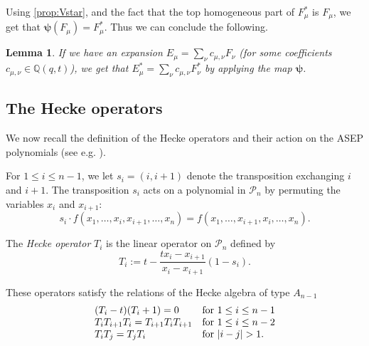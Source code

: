 \documentclass[12pt]{amsart}
\newtheorem{lem}[thm]{Lemma}
\theoremstyle{definition}
\newcommand{\mcP}{\mathcal P}
\newcommand{\QQ}{\mathbb Q}
\def\LW#1{(\textcolor{teal}{LW:#1})}
\begin{document}
\begin{appendices}
Using %
\cref{prop:Vstar}, and the fact that the top homogeneous part of $F^*_\mu$ is $F_\mu$, we get that
$\boldsymbol{\psi}(F_\mu)=F_\mu^*$. Thus we can conclude the following.

\begin{lem}\label{lem:dehomog}
If we have an expansion 
$E_\mu=\sum_{\nu}c_{\mu,\nu}F_\nu$
(for some coefficients $c_{\mu,\nu}\in \QQ(q,t)$), we get that 
$E^*_\mu=\sum_{\nu}c_{\mu,\nu}F^*_\nu$ by applying the map $\boldsymbol{\psi}$.
\end{lem}

\subsection{The Hecke operators}
We now recall the definition of the Hecke operators and their action on the ASEP polynomials (see e.g. \cite[Section 2.3]{BenDaliWilliams2025}).

For $1\leq i \leq n-1$, we let $s_i=(i,i+1)$ denote the transposition exchanging $i$ and $i+1$. The transposition $s_i$ acts on a polynomial in $\mcP_n$ by permuting the variables $x_i$ and $x_{i+1}$:
$$s_i\cdotp f(x_1,\dots,x_i,x_{i+1},\dots,x_n)
=f(x_1,\dots,x_{i+1},x_i,\dots,x_n).$$

The \emph{Hecke operator} $T_i$ is the linear operator on $\mcP_n$ defined by 
\begin{equation}\label{eq:Hecke}
T_i:=t-\frac{tx_i-x_{i+1}}{x_i-x_{i+1}}(1-s_i).
\end{equation}

These operators satisfy the relations of the Hecke algebra of type $A_{n-1}$
\begin{equation}\label{eq:Hecke_algebra}
\begin{array}{ll}
(T_i-t)(T_i+1)=0 & \text{for $1\leq i \leq n-1$}     \\
 T_iT_{i+1}T_i=T_{i+1}T_iT_{i+1}    & \text{for $1\leq i \leq n-2$}\\
 T_iT_j=T_jT_i    & \text{for $ |i-j| > 1$}.\\
\end{array}
\end{equation}



\end{appendices}
\end{document}

